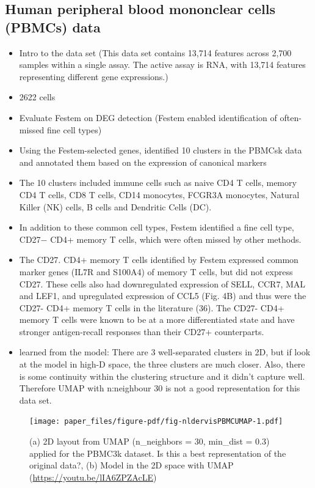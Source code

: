\documentclass[
  12pt]{article}
\begin{document}
\hypertarget{human-peripheral-blood-mononclear-cells-pbmcs-data}{%
\subsection{Human peripheral blood mononclear cells (PBMCs)
data}\label{human-peripheral-blood-mononclear-cells-pbmcs-data}}

\begin{itemize}
\item
  Intro to the data set (This data set contains 13,714 features across
  2,700 samples within a single assay. The active assay is RNA, with
  13,714 features representing different gene expressions.)
\item
  2622 cells
\item
  Evaluate Festem on DEG detection (Festem enabled identification of
  often-missed fine cell types)
\item
  Using the Festem-selected genes, identified 10 clusters in the PBMCsk
  data and annotated them based on the expression of canonical markers
\item
  The 10 clusters included immune cells such as naive CD4 T cells,
  memory CD4 T cells, CD8 T cells, CD14 monocytes, FCGR3A monocytes,
  Natural Killer (NK) cells, B cells and Dendritic Cells (DC).
\item
  In addition to these common cell types, Festem identified a fine cell
  type, CD27− CD4+ memory T cells, which were often missed by other
  methods.
\item
  The CD27. CD4+ memory T cells identified by Festem expressed common
  marker genes (IL7R and S100A4) of memory T cells, but did not express
  CD27. These cells also had downregulated expression of SELL, CCR7, MAL
  and LEF1, and upregulated expression of CCL5 (Fig. 4B) and thus were
  the CD27- CD4+ memory T cells in the literature (36). The CD27- CD4+
  memory T cells were known to be at a more differentiated state and
  have stronger antigen-recall responses than their CD27+ counterparts.
\item
  learned from the model: There are 3 well-separated clusters in 2D, but
  if look at the model in high-D space, the three clusters are much
  closer. Also, there is some continuity within the clustering structure
  and it didn't capture well. Therefore UMAP with n:neighbour 30 is not
  a good representation for this data set.
\end{itemize}

\begin{figure}

{\centering \texttt{[image: paper\_files/figure-pdf/fig-nldervisPBMCUMAP-1.pdf]}

}

\caption{\label{fig-nldervisPBMCUMAP}(a) 2D layout from UMAP
(n\_neighbors = 30, min\_dist = 0.3) applied for the PBMC3k dataset. Is
this a best representation of the original data?, (b) Model in the 2D
space with UMAP (\url{https://youtu.be/lIA6ZPZAcLE})}

\end{figure}
\end{document}
